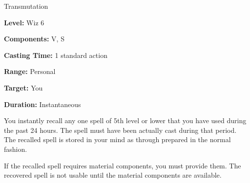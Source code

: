 
Transmutation

\textbf{Level:} Wiz 6

\textbf{Components:} V, S

\textbf{Casting Time:} 1 standard action

\textbf{Range:} Personal

\textbf{Target:} You

\textbf{Duration:} Instantaneous

You instantly recall any one spell of 5th level or lower that you have used during 
the past 24 hours. The spell must have been actually cast during that period. The 
recalled spell is stored in your mind as through prepared in the normal fashion.

If the recalled spell requires material components, you must provide them. The 
recovered spell is not usable until the material components are available.

